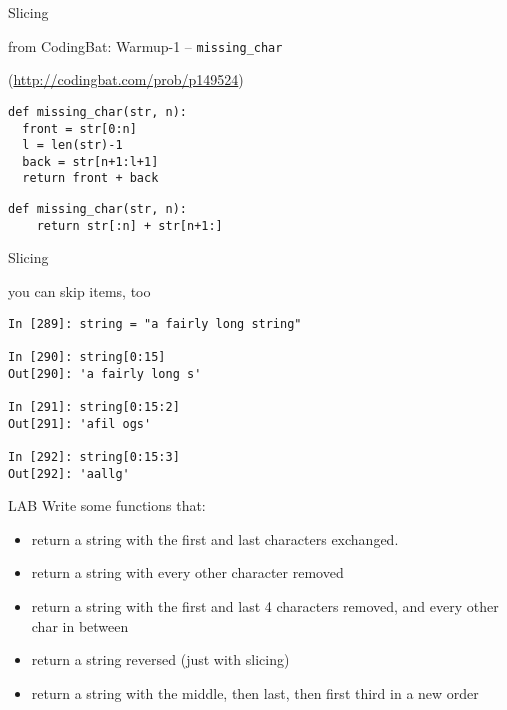 \documentclass{beamer}
\begin{document}
\begin{frame}[fragile]{Slicing}

{\Large from CodingBat: Warmup-1 -- \verb+missing_char+ }

(\url{http://codingbat.com/prob/p149524})

\begin{verbatim}
def missing_char(str, n):
  front = str[0:n]
  l = len(str)-1
  back = str[n+1:l+1]
  return front + back
\end{verbatim}

\begin{verbatim}
def missing_char(str, n):
    return str[:n] + str[n+1:]
\end{verbatim}

\end{frame} 

\begin{frame}[fragile]{Slicing}

{\Large you can skip items, too}

\begin{verbatim}
In [289]: string = "a fairly long string"

In [290]: string[0:15]
Out[290]: 'a fairly long s'

In [291]: string[0:15:2]
Out[291]: 'afil ogs'

In [292]: string[0:15:3]
Out[292]: 'aallg'
\end{verbatim}

\end{frame} 

\begin{frame}[fragile]{LAB}
Write some functions that:
\begin{itemize}
  \item return a string with the first and last characters exchanged.
  \item return a string with every other character removed
  \item return a string with the first and last 4 characters removed, and every other char in between
  \item return a string reversed (just with slicing)
  \item return a string with the middle, then last, then first third in a new order
\end{itemize}

\end{frame}
\end{document}
